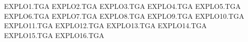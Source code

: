 EXPLO1.TGA
EXPLO2.TGA
EXPLO3.TGA
EXPLO4.TGA
EXPLO5.TGA
EXPLO6.TGA
EXPLO7.TGA
EXPLO8.TGA
EXPLO9.TGA
EXPLO10.TGA
EXPLO11.TGA
EXPLO12.TGA
EXPLO13.TGA
EXPLO14.TGA
EXPLO15.TGA
EXPLO16.TGA